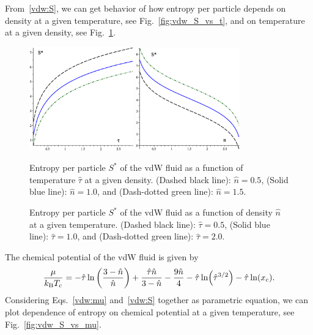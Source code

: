 \documentclass[12pt]{article}
\numberwithin{equation}{section}
\begin{document}
	From~\eqref{vdw:S}, we can get behavior of how entropy per particle depends on density at a given temperature, see Fig.~\ref{fig:vdw_S_vs_t}, and on temperature at a given density, see Fig.~\ref{fig:vdw_S_vs_n}. 
	
	\begin{figure}[htbp]
		\includegraphics[width=0.4\textwidth,angle=0]{vdw_S_vs_t}
		\hfill
		\includegraphics[width=0.4\textwidth,angle=0]{vdw_S_vs_n}
		\\
		\parbox{0.45\textwidth}{\caption{\label{fig:vdw_S_vs_t} Entropy per particle $S^{*}$ of the vdW fluid as a function of temperature $\hat{\tau}$ at a given density. (Dashed black line): $\hat{n}=0.5$, (Solid blue line): $\hat{n}=1.0$, and (Dash-dotted green line): $\hat{n}=1.5$.}}
		\hfill
		\parbox{0.45\textwidth}{\caption{\label{fig:vdw_S_vs_n} Entropy per particle $S^{*}$ of the vdW fluid as a function of density $\hat{n}$ at a given temperature. (Dashed black line): $\hat{\tau}=0.5$, (Solid blue line): $\hat{\tau}=1.0$, and (Dash-dotted green line): $\hat{\tau}=2.0$.}}
	\end{figure}
	
	The chemical potential of the vdW fluid is given by~\cite[(70c)]{Johnston14}
	\begin{equation}
		\label{vdw:mu}
		\frac{\mu}{k_{\rm B}T_c} = -\hat{\tau} \ln \left(\frac{3-\hat{n}}{\hat{n}}\right) + \frac{\hat{\tau}\hat{n}}{3-\hat{n}} - \frac{9\hat{n}}{4} - \hat{\tau}\ln(\hat{\tau}^{3/2}) - \hat{\tau}\ln(x_c).
	\end{equation}
	Considering Eqs.~\eqref{vdw:mu} and~\eqref{vdw:S} together as parametric equation, we can plot dependence of entropy on chemical potential at a given temperature, see Fig.~\ref{fig:vdw_S_vs_mu}.
	
\end{document}
